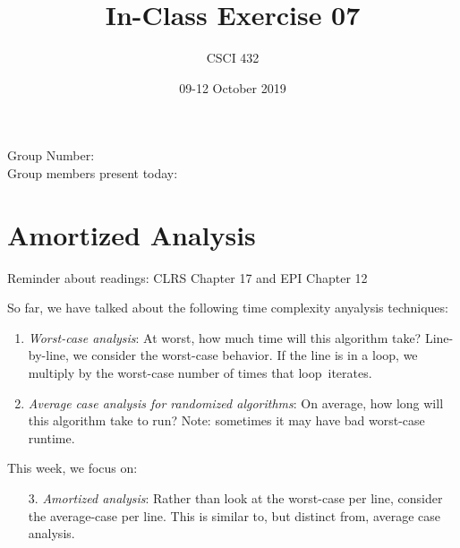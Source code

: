 \documentclass{article}
\title{In-Class Exercise 07}
\author{CSCI 432}
\date{09-12 October 2019}
\begin{document}
\maketitle

\noindent
Group Number:\\
Group members present today:

\section*{Amortized Analysis}

Reminder about readings: CLRS Chapter 17 and EPI Chapter 12

So far, we have talked about the following time complexity anyalysis techniques:
\begin{enumerate}
    \item \emph{Worst-case analysis}: At worst, how much time will this algorithm take?
        Line-by-line, we consider the worst-case behavior.  If the line is in a
        loop, we multiply by the worst-case number of times that loop~iterates.
    \item \emph{Average case analysis for randomized algorithms}: On average, how long
        will this algorithm take to run?  Note: sometimes it may have bad
        worst-case runtime.
\end{enumerate}
This week, we focus on:
\begin{enumerate}
    \item[3.] \emph{Amortized analysis}: Rather than look at the worst-case per
        line, consider the average-case per line.  This is similar to, but
        distinct from, average case analysis.
\end{enumerate}
\end{document}
